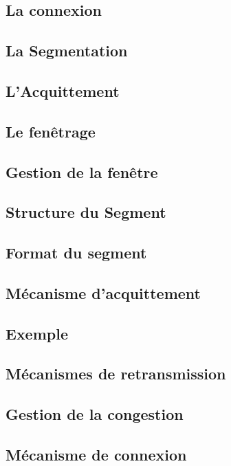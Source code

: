 \documentclass[12pt]{article}
\begin{document}
\subsection{La connexion}


\subsection{La Segmentation}


\subsection{L’Acquittement}


\subsection{Le fenêtrage}


\subsection{Gestion de la fenêtre}


\subsection{Structure du Segment}


\subsection{Format du segment}

\subsection{Mécanisme d’acquittement}


\subsection{Exemple}


\subsection{Mécanismes de retransmission}


\subsection{Gestion de la congestion}


\subsection{Mécanisme de connexion}
\end{document}

